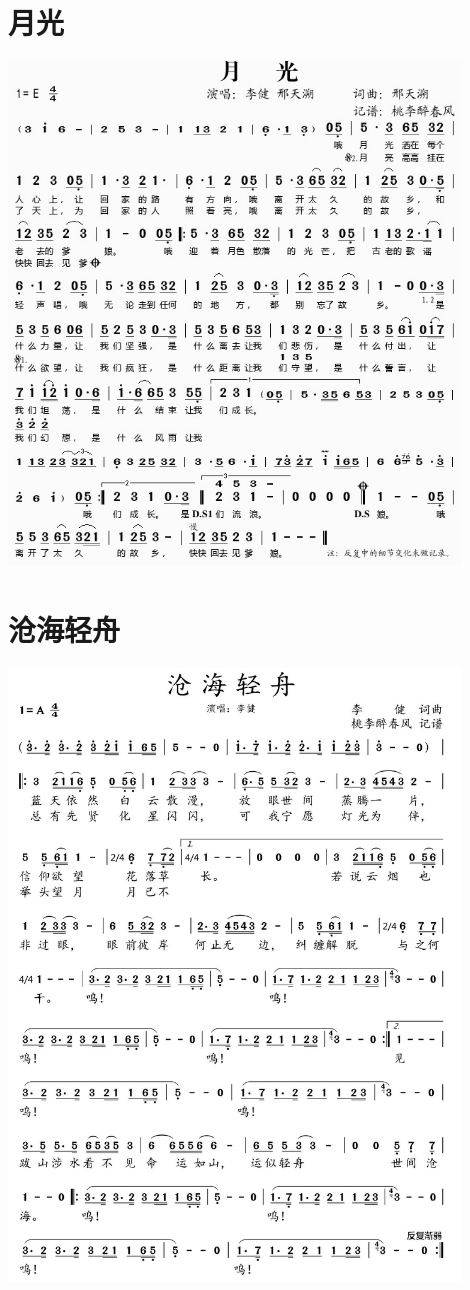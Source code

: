 \documentclass[cn,pad,twocol]{elegantbook}
\begin{document}
\section{月光} \includegraphics[width=0.9\textwidth]{rpi400/20210212李健月光.jpg}
\section{沧海轻舟} \includegraphics[width=0.9\textwidth]{rpi400/20210212李健沧海轻舟.jpg}
\end{document}
